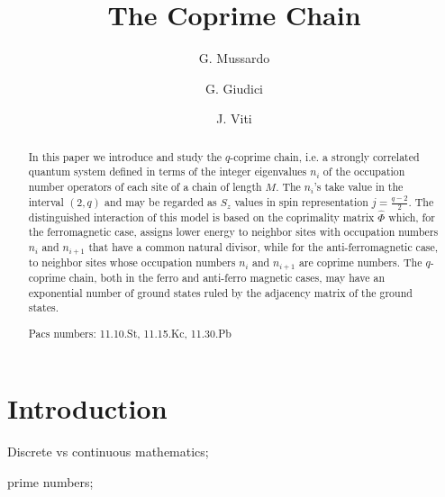 \documentclass[aps,pra,superscriptaddress]{revtex4}
\renewcommand{\(}{\left(}
\renewcommand{\)}{\right)}
\renewcommand{\[}{\left[}
\renewcommand{\]}{\right]}
\begin{document}



\title{{\Large {\bf The Coprime Chain}}}

\author{G. Mussardo}
\author{G. Giudici}
\author{J. Viti} 

\begin{abstract}
\noindent

In this paper we introduce and study the $q$-coprime chain, i.e. a strongly correlated quantum system defined in terms of 
the integer eigenvalues $n_i$ of the occupation number operators of each site of a chain of length $M$. The $n_i$'s take value  
in the interval $(2,q)$ and may be regarded as $S_z$ values in spin representation $j = \frac{q-2}{2}$. 
The distinguished interaction of this model is based on the coprimality matrix $\widehat \Phi$ which, for the ferromagnetic case, 
assigns lower energy to neighbor sites with occupation numbers $n_i$ and $n_{i+1}$ that have a common natural divisor, while 
for the anti-ferromagnetic case, to neighbor sites whose occupation numbers $n_i$ and $n_{i+1}$ are coprime numbers. 
The $q$-coprime chain, both in the ferro and anti-ferro magnetic cases, may have an exponential number of ground states 
ruled by the adjacency matrix of the ground states.




\vspace{3mm}
\noindent
Pacs numbers: 11.10.St, 11.15.Kc, 11.30.Pb

\end{abstract}
\maketitle



\section{Introduction}
\label{sec:intro}
\noindent

Discrete vs continuous mathematics; 

prime numbers; 
\end{document}
